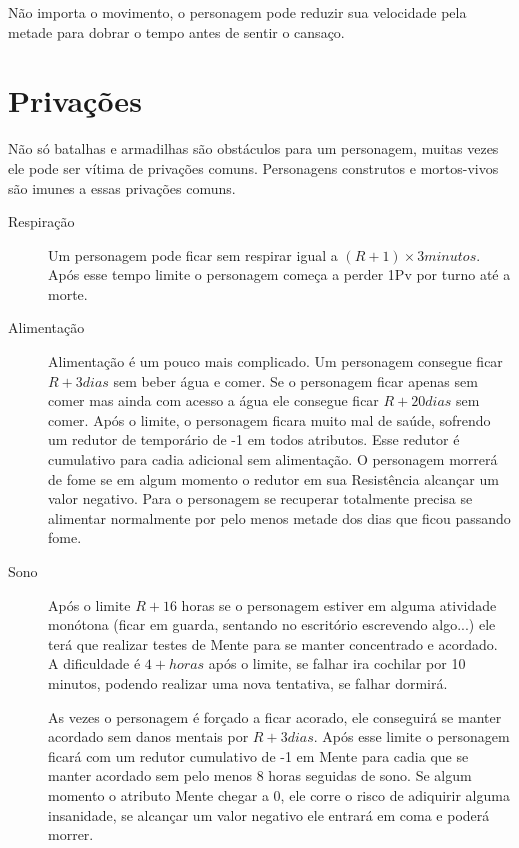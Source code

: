 Não importa o movimento, o personagem pode reduzir sua velocidade pela metade para dobrar o tempo antes de sentir o cansaço. 

\section{Privações}
Não só batalhas e armadilhas são obstáculos para um personagem, muitas vezes ele pode ser vítima de privações comuns. Personagens construtos e mortos-vivos são imunes a essas privações comuns.

\begin{description}

\item[Respiração] Um personagem pode ficar sem respirar igual a \( (R+1) \times 3 minutos \). Após esse tempo limite o personagem começa a perder 1Pv por turno até a morte.

\item[Alimentação] Alimentação é um pouco mais complicado. Um personagem consegue ficar \( R + 3 dias \) sem beber água e comer. Se o personagem ficar apenas sem comer mas ainda com acesso a água ele consegue ficar \( R + 20 dias \) sem comer.
Após o limite, o personagem ficara muito mal de saúde, sofrendo um redutor de temporário de -1 em todos atributos. Esse redutor é cumulativo para cadia adicional sem alimentação. O personagem morrerá de fome se em algum momento  o redutor em sua Resistência alcançar um valor negativo.
Para o personagem se recuperar totalmente precisa se alimentar normalmente por pelo menos metade dos dias que ficou passando fome.
\item[Sono] Após o limite \( R + 16 \) horas se o personagem estiver em alguma atividade monótona (ficar em guarda, sentando no escritório escrevendo algo...) ele terá que realizar testes de Mente para se manter concentrado e acordado. A dificuldade é \(4 + horas \) após o limite, se falhar ira cochilar por 10 minutos, podendo realizar uma nova tentativa, se falhar dormirá.

As vezes o personagem é forçado a ficar acorado, ele conseguirá se manter acordado sem danos mentais por \( R + 3 dias \). Após esse limite o personagem ficará com um redutor cumulativo de -1 em Mente para cadia que se manter acordado sem pelo menos 8 horas seguidas de sono. Se algum momento o atributo Mente chegar a 0, ele corre o risco de adiquirir alguma insanidade, se alcançar um valor negativo ele entrará em coma e poderá morrer.

\end{description}
